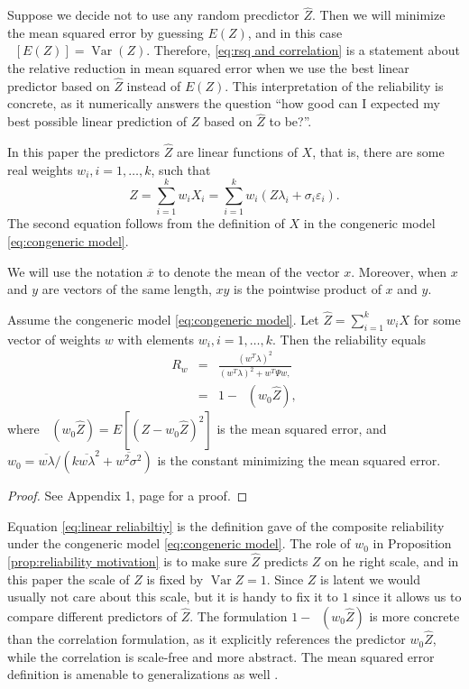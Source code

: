 \documentclass[twoside]{article}
\DeclareMathOperator{\Var}{Var}
\DeclareMathOperator{\MSE}{MSE_Z}
\begin{document}
Suppose we decide not to use any random precdictor $\hat{Z}$. Then we will minimize the mean squared error by guessing $E(Z)$, and in this case $\MSE[E(Z)]=\Var(Z)$. Therefore, \cref{eq:rsq and correlation} is a statement about the relative reduction in mean squared error when we use the best linear predictor based on $\hat{Z}$ instead of $E(Z)$. This interpretation of the reliability is concrete, as it numerically answers the question ``how good can I expected my best possible linear prediction of $Z$ based on $\hat{Z}$ to be?''.

In this paper the predictors $\hat{Z}$ are linear functions of $X$, that is, there are some real weights $w_{i},i=1,\ldots,k$, such that
\begin{equation}
\label{eq:Linear predictor}
\hat{Z} =  \sum_{i=1}^{k} w_{i}X_i = \sum_{i=1}^{k}w_{i}(Z\lambda_i + \sigma_{i} \varepsilon_i).\nonumber 
\end{equation}
The second equation follows from the definition of $X$ in the congeneric model \eqref{eq:congeneric model}. 

We will use the notation $\overline{x}$ to denote the mean of the vector $x$. Moreover, when $x$ and $y$ are vectors of the same length, $xy$ is the pointwise product of $x$ and $y$.

\begin{prop}
\label{prop:reliability motivation}Assume the congeneric model \eqref{eq:congeneric model}. Let $\hat{Z}=\sum_{i=1}^{k}w_{i}X$
for some vector of weights $w$ with elements $w_{i},i=1,\ldots,k$. Then the reliability equals
\begin{eqnarray}
 R_w & = & \frac{(w^{T}\lambda)^{2}}{(w^{T}\lambda)^{2}+w^{T}\Psi w,}\label{eq:linear reliabiltiy}\\
 & = & 1- \MSE (w_{0}\hat{Z}),\label{eq:MSE}
\end{eqnarray}
where $\MSE (w_{0}\hat{Z})=E[(Z-w_{0}\hat{Z})^{2}]$ is the
mean squared error, and $w_{0}=\overline{w\lambda}/(k\overline{w\lambda}^{2}+\overline{w^{2}\sigma^{2}})$ is the constant minimizing the mean squared error.
\end{prop}
\begin{proof}
See Appendix 1, page \pageref{proof:reliability motivation} for a proof.
\end{proof}

Equation \eqref{eq:linear reliabiltiy} is the definition \citet[][p. 112]{Joreskog1971-nn} gave of the composite reliability under the congeneric model \eqref{eq:congeneric model}. 
The role of $w_0$ in Proposition \ref{prop:reliability motivation} is to make sure $\hat{Z}$ predicts $Z$ on he right scale, and in this paper the scale of $Z$ is fixed by $\Var Z = 1$. Since $Z$ is latent we would usually not care about this scale, but it is handy to fix it to $1$ since it allows us to compare different predictors of $\hat{Z}$. The formulation $1-\MSE (w_{0}\hat{Z})$ is more concrete than the correlation formulation, as it explicitly references the predictor $w_{0}\hat{Z}$, while the correlation is scale-free and more abstract. The mean squared error definition is amenable to generalizations as well \citep{Korn1991-lw}.
\end{document}
